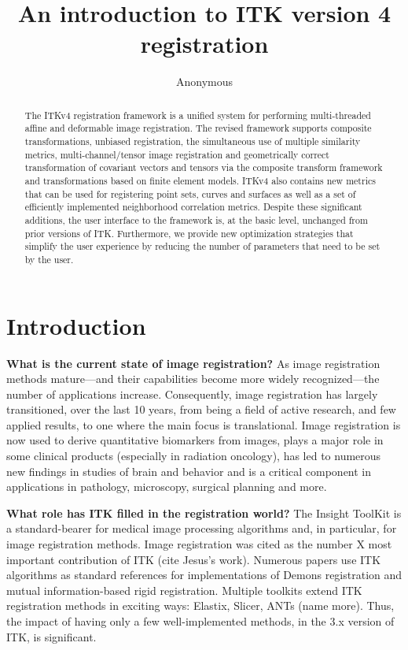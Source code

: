 \documentclass{llncs}
\begin{document}
\vspace{-0.1in}
\title{An introduction to ITK version 4 registration}
\author{Anonymous}
\maketitle              
\begin{abstract}
The ITKv4 registration framework is a unified system for performing
multi-threaded affine and deformable image registration.  The revised
framework supports composite transformations, unbiased registration,
the simultaneous use of multiple similarity metrics,
multi-channel/tensor image registration and geometrically correct
transformation of covariant vectors and tensors via the composite
transform framework and transformations based on finite element
models.  ITKv4 also contains new metrics that can be used for
registering point sets, curves and surfaces as well as a set of
efficiently implemented neighborhood correlation metrics.  Despite
these significant additions, the user interface to the framework is,
at the basic level, unchanged from prior versions of ITK.
Furthermore, we provide new optimization strategies that simplify the
user experience by reducing the number of parameters that need to be
set by the user.
\end{abstract}

\section{Introduction}
{\bf What is the current state of image registration?}  As image
registration methods mature---and their capabilities become more
widely recognized---the number of applications increase.
Consequently, image registration has largely transitioned, over the
last 10 years, from being a field of active research, and few applied
results, to one where the main focus is translational.  Image
registration is now used to derive quantitative biomarkers from
images, plays a major role in some clinical products (especially in
radiation oncology), has led to numerous new findings in studies of
brain and behavior and is a critical component in applications in
pathology, microscopy, surgical planning and more.


{\bf What role has ITK filled in the registration world?}  The Insight
ToolKit is a standard-bearer for medical image processing algorithms
and, in particular, for image registration methods.  Image
registration was cited as the number X most important contribution of
ITK (cite Jesus's work).  Numerous papers use ITK algorithms as
standard references for implementations of Demons registration and mutual
information-based rigid registration.  Multiple toolkits extend ITK
registration methods in exciting ways:  Elastix, Slicer, ANTs (name
more).  Thus, the impact of having only a few well-implemented
methods, in the 3.x version of ITK, is significant.  
\end{document}
